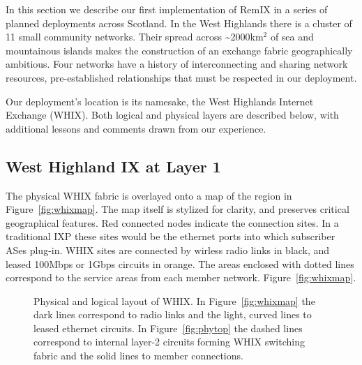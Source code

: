 
In this section we describe our first implementation of RemIX in a series of planned deployments across Scotland. In the West Highlands there
is a cluster of
11 small community networks. Their spread across \textasciitilde 2000km$^2$
of sea and mountainous islands makes the
construction of an exchange fabric geographically ambitious. Four networks have
a history of interconnecting and sharing network resources, pre-established
relationships that must be respected in our deployment.

Our deployment's location is its namesake, the West Highlands Internet
Exchange (WHIX). Both logical and physical layers are described below, with
additional lessons and comments drawn from our experience.

\subsection{West Highland IX at Layer 1}

The physical \ac{WHIX} fabric is overlayed onto a map of the region in
Figure~\ref{fig:whixmap}. The map itself is stylized for clarity, and
preserves critical geographical features. Red connected nodes indicate
the connection sites. In a traditional IXP these sites would be the
ethernet ports into which subscriber ASes plug-in. WHIX sites are
connected by wirless radio links in black, and leased 100Mbps or 1Gbps
circuits in orange. The areas enclosed with dotted lines correspond to
the service areas from each member network.
Figure~\ref{fig:whixmap}.
\begin{figure*}
  \centering
  \hspace{\columnsep}
  \caption{Physical and logical layout of \ac{WHIX}. In
  Figure~\ref{fig:whixmap} the dark lines correspond to radio links
  and the light, curved lines to leased ethernet circuits.
  In Figure~\ref{fig:phytop} the dashed lines
  correspond to internal layer-2 circuits forming \ac{WHIX}
  switching fabric and the solid lines to member connections.}
\end{figure*}

